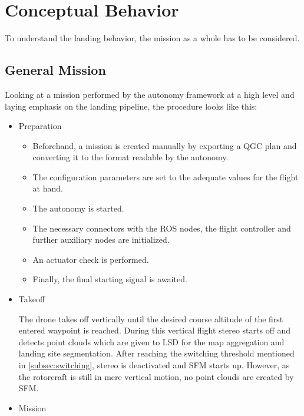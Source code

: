 \section{Conceptual Behavior}\label{sec:concept_beh}

To understand the landing behavior, the mission as a whole has to be considered.

\subsection{General Mission}

Looking at a mission performed by the autonomy framework at a high level and laying emphasis on the landing pipeline, the procedure looks like this:

\begin{itemize}
    \item Preparation
    
        \begin{itemize}
            \item Beforehand, a mission is created manually by exporting a QGC plan and converting it to the format readable by the autonomy.
            \item The configuration parameters are set to the adequate values for the flight at hand.
            \item The autonomy is started.
            \item The necessary connectors with the ROS nodes, the flight controller and further auxiliary nodes are initialized.
            \item An actuator check is performed.
            \item Finally, the final starting signal is awaited.
        \end{itemize}
        

    \item Takeoff
    
    The drone takes off vertically until the desired course altitude of the first entered waypoint is reached. During this vertical flight stereo starts off and detects point clouds which are given to LSD for the map aggregation and landing site segmentation. After reaching the switching threshold mentioned in \cref{subsec:switching}, stereo is deactivated and SFM starts up. However, as the rotorcraft is still in mere vertical motion, no point clouds are created by SFM.

    \item Mission


\end{itemize}
